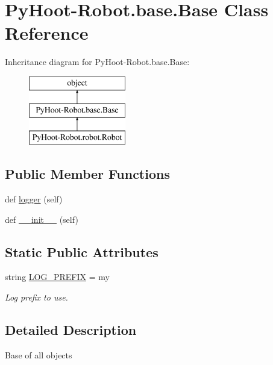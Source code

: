 \hypertarget{class_py_hoot-_robot_1_1base_1_1_base}{}\section{Py\+Hoot-\/\+Robot.base.\+Base Class Reference}
\label{class_py_hoot-_robot_1_1base_1_1_base}
Inheritance diagram for Py\+Hoot-\/\+Robot.base.\+Base\+:\begin{figure}[H]
\begin{center}
\leavevmode
\includegraphics[height=3.000000cm]{de/d19/class_py_hoot-_robot_1_1base_1_1_base}
\end{center}
\end{figure}
\subsection*{Public Member Functions}
\begin{DoxyCompactItemize}
\item 
def \hyperlink{class_py_hoot-_robot_1_1base_1_1_base_a07ba0b3916412d75a8a8c1bd4cd888ac}{logger} (self)
\item 
def \hyperlink{class_py_hoot-_robot_1_1base_1_1_base_ad75ea533368cd3e78d8533cc93be82f7}{\+\_\+\+\_\+init\+\_\+\+\_\+} (self)
\end{DoxyCompactItemize}
\subsection*{Static Public Attributes}
\begin{DoxyCompactItemize}
\item 
string \hyperlink{class_py_hoot-_robot_1_1base_1_1_base_a34c4b63214fb70e4165771ce77d0446b}{L\+O\+G\+\_\+\+P\+R\+E\+F\+IX} = \textquotesingle{}my\textquotesingle{}
\begin{DoxyCompactList}\small\item\em Log prefix to use. \end{DoxyCompactList}\end{DoxyCompactItemize}


\subsection{Detailed Description}
\begin{DoxyVerb}Base of all objects\end{DoxyVerb}
 

